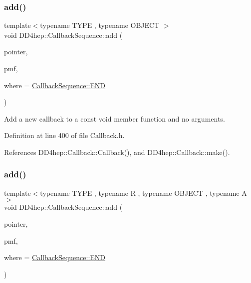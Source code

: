 \subsubsection{\texorpdfstring{add()}{add()}\hspace{0.1cm}{\footnotesize\ttfamily [5/13]}}
{\footnotesize\ttfamily template$<$typename T\+Y\+PE , typename O\+B\+J\+E\+CT $>$ \\
void D\+D4hep\+::\+Callback\+Sequence\+::add (\begin{DoxyParamCaption}\item[{T\+Y\+PE $\ast$}]{pointer,  }\item[{void(O\+B\+J\+E\+C\+T\+::$\ast$)() const}]{pmf,  }\item[{\hyperlink{struct_d_d4hep_1_1_callback_sequence_a7753490247479633aed16a2376821ef7}{Location}}]{where = {\ttfamily \hyperlink{struct_d_d4hep_1_1_callback_sequence_a7753490247479633aed16a2376821ef7ac39eeb1bcfc1c235ab1d0d9315c310ac}{Callback\+Sequence\+::\+E\+ND}} }\end{DoxyParamCaption})\hspace{0.3cm}{\ttfamily [inline]}}



Add a new callback to a const void member function and no arguments. 



Definition at line 400 of file Callback.\+h.



References D\+D4hep\+::\+Callback\+::\+Callback(), and D\+D4hep\+::\+Callback\+::make().

\hypertarget{struct_d_d4hep_1_1_callback_sequence_a7e67d853e86f3fbef9b0ef5b059eb652}{}\label{struct_d_d4hep_1_1_callback_sequence_a7e67d853e86f3fbef9b0ef5b059eb652} 
\subsubsection{\texorpdfstring{add()}{add()}\hspace{0.1cm}{\footnotesize\ttfamily [6/13]}}
{\footnotesize\ttfamily template$<$typename T\+Y\+PE , typename R , typename O\+B\+J\+E\+CT , typename A $>$ \\
void D\+D4hep\+::\+Callback\+Sequence\+::add (\begin{DoxyParamCaption}\item[{T\+Y\+PE $\ast$}]{pointer,  }\item[{R(O\+B\+J\+E\+C\+T\+::$\ast$)(A)}]{pmf,  }\item[{\hyperlink{struct_d_d4hep_1_1_callback_sequence_a7753490247479633aed16a2376821ef7}{Location}}]{where = {\ttfamily \hyperlink{struct_d_d4hep_1_1_callback_sequence_a7753490247479633aed16a2376821ef7ac39eeb1bcfc1c235ab1d0d9315c310ac}{Callback\+Sequence\+::\+E\+ND}} }\end{DoxyParamCaption})\hspace{0.3cm}{\ttfamily [inline]}}




